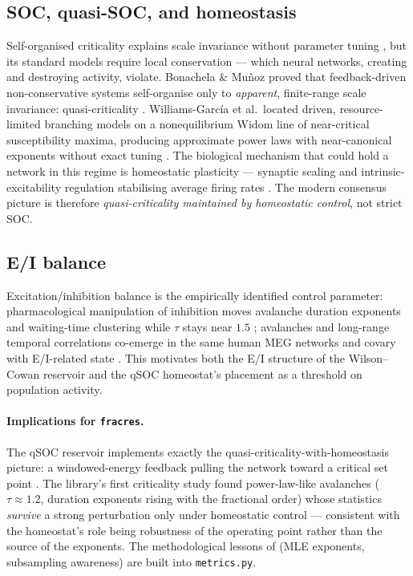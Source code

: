 \documentclass[11pt,a4paper]{article}
\begin{document}
\subsection{SOC, quasi-SOC, and homeostasis}

Self-organised criticality explains scale invariance without parameter
tuning \cite{bak1987self,jensen1998self}, but its standard models require
local conservation --- which neural networks, creating and destroying
activity, violate. Bonachela \& Mu\~noz proved that feedback-driven
non-conservative systems self-organise only to \emph{apparent}, finite-range
scale invariance: quasi-criticality \cite{bonachela2009self}.
Williams-Garc\'ia et al.\ located driven, resource-limited branching models on
a nonequilibrium Widom line of near-critical susceptibility maxima, producing
approximate power laws with near-canonical exponents without exact tuning
\cite{williamsgarcia2014quasicritical}. The biological mechanism that could
hold a network in this regime is homeostatic plasticity --- synaptic scaling
and intrinsic-excitability regulation stabilising average firing rates
\cite{turrigiano2004homeostatic}. The modern consensus picture is therefore
\emph{quasi-criticality maintained by homeostatic control}, not strict SOC.

\subsection{E/I balance}

Excitation/inhibition balance is the empirically identified control
parameter: pharmacological manipulation of inhibition moves avalanche duration
exponents and waiting-time clustering while $\tau$ stays near $1.5$
\cite{lombardi2012balance}; avalanches and long-range temporal correlations
co-emerge in the same human MEG networks and covary with E/I-related state
\cite{poil2012critical,dehghani2012avalanche}. This motivates both the E/I
structure of the Wilson--Cowan reservoir and the qSOC homeostat's placement
as a threshold on population activity.

\paragraph{Implications for \texttt{fracres}.}
The qSOC reservoir implements exactly the quasi-criticality-with-homeostasis
picture: a windowed-energy feedback pulling the network toward a critical set
point \cite{bonachela2009self,turrigiano2004homeostatic}. The library's first
criticality study found power-law-like avalanches ($\tau \approx 1.2$,
duration exponents rising with the fractional order) whose statistics
\emph{survive} a strong perturbation only under homeostatic control ---
consistent with the homeostat's role being robustness of the operating point
rather than the source of the exponents. The methodological lessons of
\cite{clauset2009power,priesemann2014spike} (MLE exponents, subsampling
awareness) are built into \texttt{metrics.py}.
\end{document}
